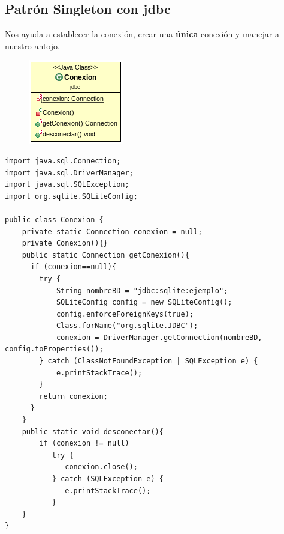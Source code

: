 \documentclass[4paper]{article}
\begin{document}
\newpage
\subsection{Patrón Singleton con jdbc}
Nos ayuda a establecer la conexión, crear una \textbf{única} conexión y manejar a nuestro antojo.
\begin{figure}[H]
\centering
\includegraphics[scale=1]{imagenes/Conexion.png}
\end{figure}
\begin{lstlisting}
import java.sql.Connection;
import java.sql.DriverManager;
import java.sql.SQLException;
import org.sqlite.SQLiteConfig;

public class Conexion {
    private static Connection conexion = null;
    private Conexion(){}
    public static Connection getConexion(){
      if (conexion==null){
        try {
            String nombreBD = "jdbc:sqlite:ejemplo";
            SQLiteConfig config = new SQLiteConfig();  
            config.enforceForeignKeys(true);  
            Class.forName("org.sqlite.JDBC");
            conexion = DriverManager.getConnection(nombreBD, config.toProperties());
        } catch (ClassNotFoundException | SQLException e) {
            e.printStackTrace();
        }
        return conexion;
      }
    }
    public static void desconectar(){
        if (conexion != null)
           try {
              conexion.close();
           } catch (SQLException e) {
              e.printStackTrace();
           }
    }
}
\end{lstlisting}
\newpage
\end{document}
